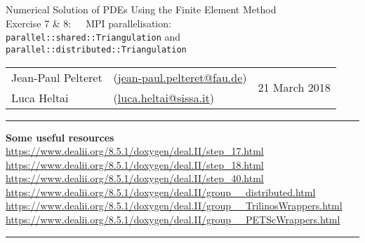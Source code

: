 \documentclass[11pt,answers]{exam}
\makeatletter
\newcommand{\makeheader}[3]{%
\setcounter{question}{0}
\begin{center}
{\sc Numerical Solution of PDEs Using the Finite Element Method}\vspace{2ex}\\
{\sc Exercise #1:\ \ \ #2}\vspace{2ex}\\
\begin{tabular*}{\textwidth}{ll @{\extracolsep{\fill}}r}
Jean-Paul Pelteret & (\url{jean-paul.pelteret@fau.de}) & \multirow{2}{*}{#3} \\
Luca Heltai & (\url{luca.heltai@sissa.it}) & \\
\end{tabular*}
\end{center}
}
\newcommand{\makeresources}[1]{%
\rule{\textwidth}{0.6mm}
\textbf{Some useful resources}\\[1.5ex]
#1 \par
\rule{\textwidth}{0.6mm}
}
\makeatother
\begin{document}


\clearpage
\makeheader{7 \& 8}{MPI parallelisation: \\\texttt{parallel::shared::Triangulation} and \texttt{parallel::distributed::Triangulation}}{21 March 2018}
\makeresources{%
\url{https://www.dealii.org/8.5.1/doxygen/deal.II/step_17.html} \\
\url{https://www.dealii.org/8.5.1/doxygen/deal.II/step_18.html} \\
\url{https://www.dealii.org/8.5.1/doxygen/deal.II/step_40.html} \\
\url{https://www.dealii.org/8.5.1/doxygen/deal.II/group__distributed.html} \\
\url{https://www.dealii.org/8.5.1/doxygen/deal.II/group__TrilinosWrappers.html} \\
\url{https://www.dealii.org/8.5.1/doxygen/deal.II/group__PETScWrappers.html}
}





\end{document}
